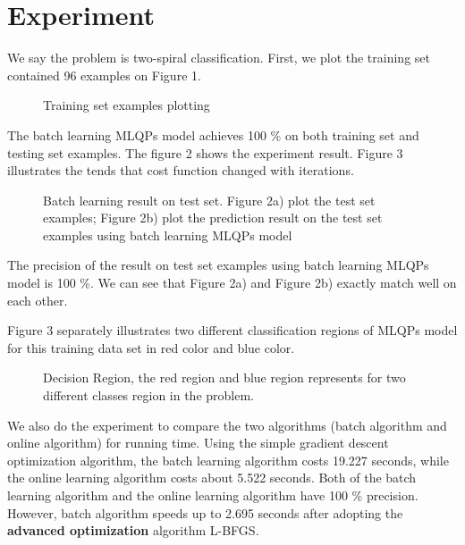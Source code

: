 \section{Experiment}
We say the problem is two-spiral classification. First, we plot the training set contained 96 examples on Figure 1.

\begin{figure}
\centering
{}
\caption{Training set examples plotting}
\end{figure}

The batch learning MLQPs model achieves 100 \% on both training set and testing set examples. The figure 2 shows the experiment result. Figure 3 illustrates the tends that cost function changed with iterations.

\begin{figure}
\centering
{}
\caption{Batch learning result on test set. Figure 2a) plot the test set examples; Figure 2b) plot the prediction result on the test set examples using batch learning MLQPs model}
\end{figure}

The precision of the result on test set examples using batch learning MLQPs model is 100 \%. We can see that Figure 2a) and Figure 2b) exactly match well on each other.

Figure 3 separately illustrates two different classification regions of MLQPs model for this training data set in red color and blue color.
\begin{figure}
\centering
{}
\caption{Decision Region, the red region and blue region represents for two different classes region in the problem. }
\end{figure}

We also do the experiment to compare the two algorithms (batch algorithm and online algorithm) for running time. Using the simple gradient descent optimization algorithm, the batch learning algorithm costs 19.227 seconds, while the online learning algorithm costs about 5.522 seconds. Both of the batch learning algorithm and the online learning algorithm have 100 \% precision. However, batch algorithm speeds up to 2.695 seconds after adopting the \textbf{advanced optimization} algorithm L-BFGS.

